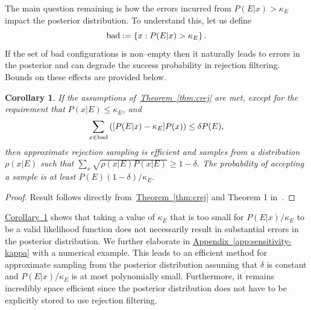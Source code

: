 \documentclass{article} %
\newtheorem{corollary}{Corollary}
\newcommand{\app}[1]{\hyperref[app:#1]{Appendix~\ref*{app:#1}}}
\newcommand{\thm}[1]{\hyperref[thm:#1]{Theorem~\ref*{thm:#1}}}
\newcommand{\cor}[1]{\hyperref[cor:#1]{Corollary~\ref*{cor:#1}}}
\begin{document}
The main question remaining is how  the
errors incurred from $P(E|x) > \kappa_E$ impact the posterior distribution.
To understand this, let us define
\begin{equation}
{\rm bad} := \left\{x: {P(E|x)} >{\kappa_E}\right\}.
\end{equation}
If the set of bad configurations is non--empty then it naturally leads to errors in the posterior and
can degrade the success probability in rejection filtering.  Bounds on these effects are
provided below.

\begin{corollary}\label{cor:badalgorithm}
If the assumptions of~\thm{crej} are met, except for the requirement that $P(x|E) \le \kappa_E$, and
$$\sum_{x\in {\rm bad}}  \left([P(E|x)-\kappa_E] P(x)\right) \le \delta P(E),$$
  then approximate rejection sampling is  efficient and samples from a distribution $\rho(x|E)$ such that ${\sum_x \sqrt{\rho(x|E) P(x|E)}} \ge 1-\delta$.
The probability of accepting a sample is at least ${P(E) (1-\delta)}/{\kappa_E}$.\label{thm:kappa}
\end{corollary}
\begin{proof}
Result follows directly from~\thm{crej} and Theorem 1 in~\cite{WKGS15}.
\end{proof}

\cor{badalgorithm} shows that taking a value of $\kappa_E$ that is too small for $P(E|x)/\kappa_E$ to be a valid likelihood function does not necessarily result in substantial errors in the posterior distribution.
We further elaborate in \app{sensitivity-kappa} with a numerical example.
This leads to an efficient method for approximate sampling from the posterior distribution assuming that $\delta$ is constant and $P(E|x)/\kappa_E$ is at most polynomially small.  Furthermore, it remains incredibly space efficient since the posterior distribution does not have to be explicitly stored to use rejection filtering.
\end{document}
